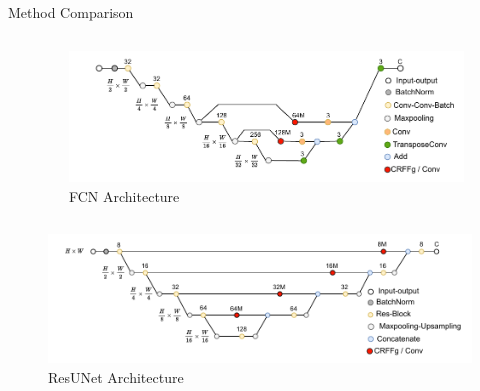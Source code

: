 \documentclass[aspectratio=169]{beamer}
\begin{document}
\begin{frame}{Method Comparison}

\vspace{-0.9cm}
\begin{columns}[t] %
    \begin{column}{0.5\textwidth}
      \centering
      
    \end{column}

    \begin{column}{0.5\textwidth}
      \centering
      \begin{figure}
          \centering \includegraphics[width=0.98\textwidth]{Figures/fcn_arch.pdf}
          \caption{FCN Architecture}
      \end{figure}
    \end{column}
  \end{columns}


  \begin{columns}[t] %
    \begin{column}{0.5\textwidth}
      \centering
      \begin{figure}
          \centering \includegraphics[width=1\textwidth]{Figures/res_unet_arch.pdf}
          \caption{ResUNet Architecture}
      \end{figure}
    \end{column}


\end{columns}
\end{frame}
\end{document}
